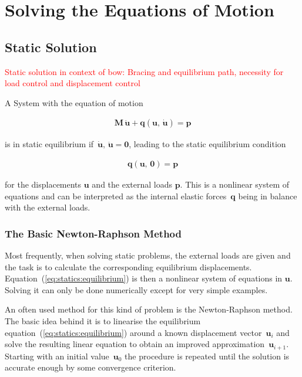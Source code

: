 \chapter{Solving the Equations of Motion}

\section{Static Solution}

\textcolor{red}{Static solution in context of bow: Bracing and equilibrium path, necessity for load control and displacement control}

A System with the equation of motion

\begin{align}
\boldsymbol{M}\,\ddot{\boldsymbol{u}} + \boldsymbol{q}(\boldsymbol{u},\,\dot{\boldsymbol{u}}) = \boldsymbol{p}
\end{align}

is in static equilibrium if~$\dot{\boldsymbol{u}},\,\ddot{\boldsymbol{u}} = \boldsymbol{0}$, leading to the static equilibrium condition

\begin{align}
\boldsymbol{q}(\boldsymbol{u},\,\boldsymbol{0}) = \boldsymbol{p}\label{eq:statics:equilibrium}
\end{align}

for the displacements $\boldsymbol{u}$ and the external loads $\boldsymbol{p}$.
This is a nonlinear system of equations and can be interpreted as the internal elastic forces~$\boldsymbol{q}$ being in balance with the external loads.

\subsection{The Basic Newton-Raphson Method}

Most frequently, when solving static problems, the external loads are given and the task is to calculate the corresponding equilibrium displacements.
Equation~(\ref{eq:statics:equilibrium}) is then a nonlinear system of equations in $\boldsymbol{u}$. Solving it can only be done numerically except for very simple examples.

An often used method for this kind of problem is the Newton-Raphson method. The basic idea behind it is to linearise the equilibrium equation~(\ref{eq:statics:equilibrium}) around a known displacement vector~$\boldsymbol{u}_i$ and solve the resulting linear equation to obtain an improved approximation~$\boldsymbol{u}_{i+1}$. Starting with an initial value~$\boldsymbol{u}_0$ the procedure is repeated until the solution is accurate enough by some convergence criterion.

